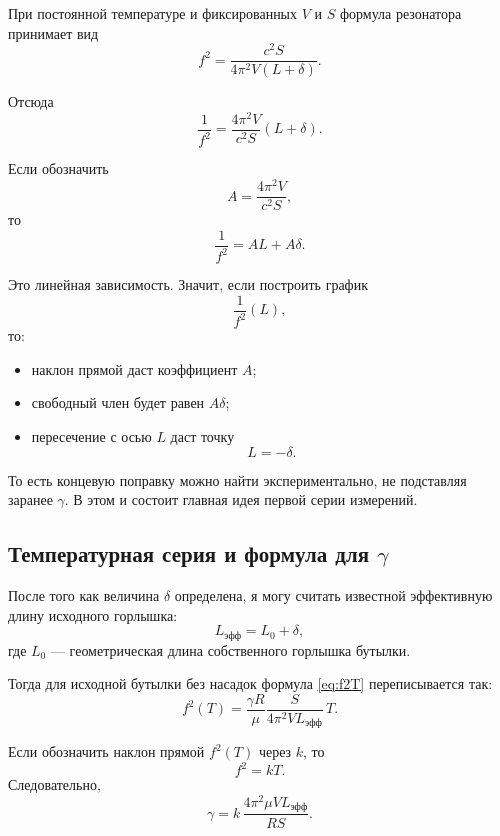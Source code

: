 \documentclass[a4paper,12pt]{article}
\begin{document}
	При постоянной температуре и фиксированных \(V\) и \(S\) формула резонатора принимает вид
	\[
	f^2=\frac{c^2S}{4\pi^2V(L+\delta)}.
	\]
	
	Отсюда
	\begin{equation}
		\frac{1}{f^2}=
		\frac{4\pi^2V}{c^2S}(L+\delta).
		\label{eq:invf2}
	\end{equation}
	
	Если обозначить
	\[
	A=\frac{4\pi^2V}{c^2S},
	\]
	то
	\begin{equation}
		\frac{1}{f^2}=AL+A\delta.
		\label{eq:linear1}
	\end{equation}
	
	Это линейная зависимость. Значит, если построить график
	\[
	\frac{1}{f^2}(L),
	\]
	то:
	\begin{itemize}
		\item наклон прямой даст коэффициент \(A\);
		\item свободный член будет равен \(A\delta\);
		\item пересечение с осью \(L\) даст точку
		\[
		L=-\delta.
		\]
	\end{itemize}
	
	То есть концевую поправку можно найти экспериментально, не подставляя заранее \(\gamma\). В этом и состоит главная идея первой серии измерений.
	
	\subsection{Температурная серия и формула для \(\gamma\)}
	
	После того как величина \(\delta\) определена, я могу считать известной эффективную длину исходного горлышка:
	\begin{equation}
		L_{\text{эфф}}=L_0+\delta,
	\end{equation}
	где \(L_0\) --- геометрическая длина собственного горлышка бутылки.
	
	Тогда для исходной бутылки без насадок формула \eqref{eq:f2T} переписывается так:
	\begin{equation}
		f^2(T)=
		\frac{\gamma R}{\mu}
		\frac{S}{4\pi^2 V L_{\text{эфф}}}
		\,T.
		\label{eq:final_linear}
	\end{equation}
	
	Если обозначить наклон прямой \(f^2(T)\) через \(k\), то
	\[
	f^2=kT.
	\]
	Следовательно,
	\begin{equation}
		\gamma=
		k\,\frac{4\pi^2 \mu V L_{\text{эфф}}}{RS}.
		\label{eq:gamma_final}
	\end{equation}
	
\end{document}
